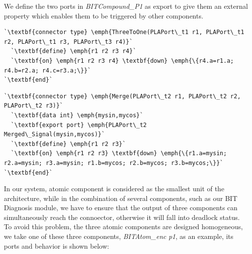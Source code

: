 We define the two ports in \emph{BITCompound\_P1} as export to give them an external property which enables them to be triggered by other components.

\begin{lstlisting}
`\textbf{connector type} \emph{ThreeToOne(PLAPort\_t1 r1, PLAPort\_t1 r2, PLAPort\_t1 r3, PLAPort\_t3 r4)}`
  `\textbf{define} \emph{r1 r2 r3 r4}`
  `\textbf{on} \emph{r1 r2 r3 r4} \textbf{down} \emph{\{r4.a=r1.a; r4.b=r2.a; r4.c=r3.a;\}}`
`\textbf{end}`
\end{lstlisting}

\begin{lstlisting}
`\textbf{connector type} \emph{Merge(PLAPort\_t2 r1, PLAPort\_t2 r2, PLAPort\_t2 r3)}`
  `\textbf{data int} \emph{mysin,mycos}`
  `\textbf{export port} \emph{PLAPort\_t2 Merged\_Signal(mysin,mycos)}`
  `\textbf{define} \emph{r1 r2 r3}`
  `\textbf{on} \emph{r1 r2 r3} \textbf{down} \emph{\{r1.a=mysin; r2.a=mysin; r3.a=mysin; r1.b=mycos; r2.b=mycos; r3.b=mycos;\}}`
`\textbf{end}`
\end{lstlisting}

In our system, atomic component is considered as the smallest unit of the architecture, while in the combination of several components, such as our BIT Diagnosis module, we have to ensure that the output of three components can simultaneously reach the connoector, otherwise it will fall into deadlock status. To avoid this problem, the three atomic components are designed homogeneous, we take one of these three components, \emph{BITAtom\_enc p1}, as an example, its ports and behavior is shown below:

